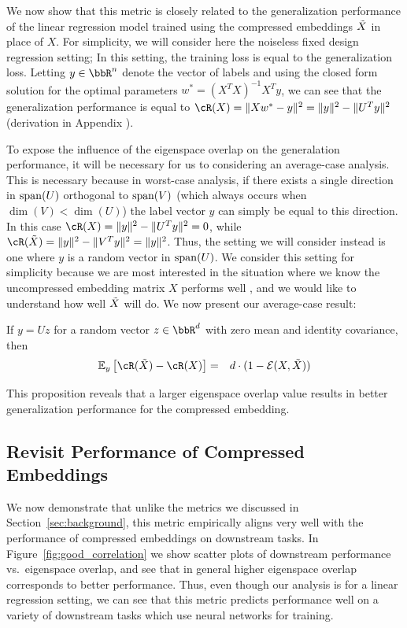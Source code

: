 We now show that this metric is closely related to the generalization performance of the linear regression model trained using the compressed embeddings $\tX$ in place of $X$.
For simplicity, we will consider here the noiseless fixed design regression setting;
In this setting, the training loss is equal to the generalization loss.
Letting $y\in\RR^n$ denote the vector of labels and using the closed form solution for the optimal parameters $w^* = (X^T X)^{-1}X^Ty$, we can see that the generalization performance is equal to $\cR(X) = \|Xw^* - y\|^2 = \|y\|^2 - \|U^T y\|^2$ (derivation in Appendix ).

To expose the influence of the eigenspace overlap on the generalation performance, it will be necessary for us to considering an average-case analysis.
This is necessary because in worst-case analysis, if there exists a single direction in $\Span(U)$ orthogonal to $\Span(V)$ (which always occurs when $\dim(V) < \dim(U)$) the label vector $y$ can simply be equal to this direction.
In this case $\cR(X) = \|y\|^2 - \|U^T y\|^2 = 0$, while $\cR(\tX) = \|y\|^2 - \|V^T y\|^2 = \|y\|^2$.
Thus, the setting we will consider instead is one where $y$ is a random vector in $\Span(U)$.
We consider this setting for simplicity because we are most interested in the situation where we know the uncompressed embedding matrix $X$ performs well , and we would like to understand how well $\tX$ will do.
We now present our average-case result:

\begin{proposition}
If $y = Uz$ for a random vector $z \in \RR^d$ with zero mean and identity covariance, then
\begin{eqnarray}
\expect{y}{\cR(\tX) - \cR(X)} &=& d\cdot(1 - \eigover(X,\tX))
\end{eqnarray}
\end{proposition}

This proposition reveals that a larger eigenspace overlap value results in better generalization performance for the compressed embedding.

\subsection{Revisit Performance of Compressed Embeddings}
\label{subsec:revisit}
We now demonstrate that unlike the metrics we discussed in Section~\ref{sec:background}, this metric empirically aligns very well with the performance of compressed embeddings on downstream tasks.
In Figure~\ref{fig:good_correlation} we show scatter plots of downstream performance vs.\ eigenspace overlap, and see that in general higher eigenspace overlap corresponds to better performance.
Thus, even though our analysis is for a linear regression setting, we can see that this metric predicts performance well on a variety of downstream tasks which use neural networks for training.

